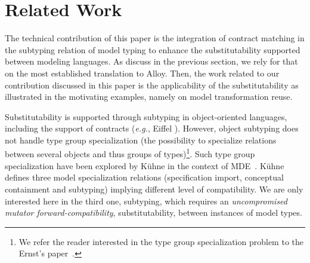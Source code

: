 \section{Related Work}\label{relatedwork}

The technical contribution of this paper is the integration of contract matching in the subtyping relation of model typing to enhance the substitutability supported between modeling languages. As discuss in the previous section, we rely for that on the most established translation to Alloy. Then, the work related to our contribution discussed in this paper is the applicability of the substitutability as illustrated in the motivating examples, namely on model transformation reuse.

Substitutability is supported through subtyping in object-oriented languages, including the support of contracts (\emph{e.g.}, Eiffel \cite{Meyer98a}). However, object subtyping does not handle type group specialization (\ie the possibility to specialize relations between several objects and thus groups of types)\footnote{We refer the reader interested in the type group specialization problem to the Ernst's paper~\cite{Ernst01}.}. Such type group specialization have been explored by K\"{u}hne in the context of MDE~\cite{Kuhne12}. K\"{u}hne defines three model specialization relations (specification import, conceptual containment and subtyping) implying different level of compatibility. We are only interested here in the third one, subtyping, which requires an \emph{uncompromised mutator forward-compatibility}, \eg substitutability, between instances of model types.

